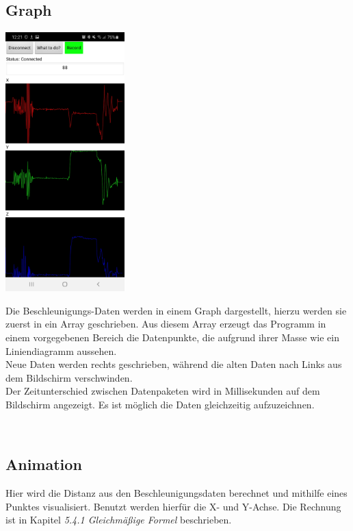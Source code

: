 \subsection{Graph}
   \begin{minipage}{0.5\textwidth}
        \includegraphics[height=10cm]{Bilder/Graph.jpg}
    \end{minipage}
    \hfill
    \begin{minipage}{0.5\textwidth}
        Die Beschleunigungs-Daten werden in einem Graph dargestellt, hierzu werden sie zuerst in ein
        Array geschrieben. Aus diesem Array erzeugt das Programm in einem vorgegebenen Bereich
        die Datenpunkte, die aufgrund ihrer Masse wie ein Liniendiagramm aussehen.\\
        Neue Daten werden rechts geschrieben, während die alten Daten nach Links aus dem
        Bildschirm verschwinden.\\
        Der Zeitunterschied zwischen Datenpaketen wird in Millisekunden auf dem Bildschirm
        angezeigt.
        Es ist möglich die Daten gleichzeitig aufzuzeichnen.\\
    \end{minipage}
\\

\subsection{Animation}
Hier wird die Distanz aus den Beschleunigungsdaten berechnet und mithilfe eines Punktes
visualisiert. Benutzt werden hierfür die X- und Y-Achse. 
Die Rechnung ist in Kapitel \textit{5.4.1 Gleichmäßige Formel}  beschrieben.

